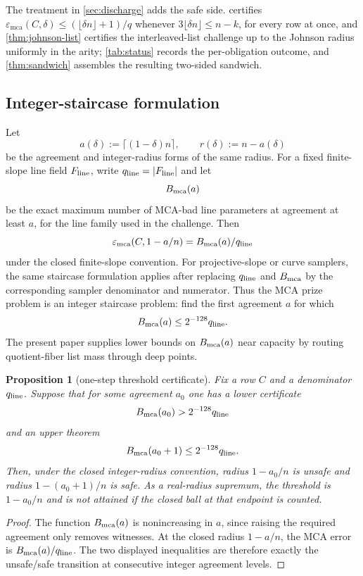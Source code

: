 \documentclass[11pt]{article}
\newtheorem{proposition}[proposition]{Proposition}
\theoremstyle{definition}
\theoremstyle{remark}
\newcommand{\emca}{\varepsilon_{\mathrm{mca}}}
\begin{document}
The treatment in \cref{sec:discharge} adds the safe side.  certifies $\emca(C,\delta)\le(\lfloor\delta n\rfloor+1)/q$ whenever $3\lfloor\delta n\rfloor\le n-k$, for every row at once, and \cref{thm:johnson-list} certifies the interleaved-list challenge up to the Johnson radius uniformly in the arity; \cref{tab:status} records the per-obligation outcome, and \cref{thm:sandwich} assembles the resulting two-sided sandwich.

\subsection{Integer-staircase formulation}

Let
\[
        a(\delta):=\lceil(1-\delta)n\rceil,
        \qquad r(\delta):=n-a(\delta)
\]
be the agreement and integer-radius forms of the same radius.  For a fixed finite-slope line
field $F_{\rm line}$, write $q_{\rm line}=|F_{\rm line}|$ and let
\[
        B_{\rm mca}(a)
\]
be the exact maximum number of MCA-bad line parameters at agreement at least
$a$, for the line family used in the challenge.  Then
\[
        \emca(C,1-a/n)=B_{\rm mca}(a)/q_{\rm line}
\]
under the closed finite-slope convention.  For projective-slope or curve samplers, the same staircase formulation applies after replacing $q_{\rm line}$ and $B_{\rm mca}$ by the corresponding sampler denominator and numerator.  Thus the MCA prize problem is an
integer staircase problem: find the first agreement $a$ for which
\[
        B_{\rm mca}(a)\le 2^{-128}q_{\rm line}.
\]
The present paper supplies lower bounds on $B_{\rm mca}(a)$ near capacity by
routing quotient-fiber list mass through deep points.

\begin{proposition}[one-step threshold certificate]\label{prop:onestep}
Fix a row $C$ and a denominator $q_{\rm line}$.  Suppose that for some agreement
$a_0$ one has a lower certificate
\[
        B_{\rm mca}(a_0)>2^{-128}q_{\rm line}
\]
and an upper theorem
\[
        B_{\rm mca}(a_0+1)\le2^{-128}q_{\rm line}.
\]
Then, under the closed integer-radius convention, radius $1-a_0/n$ is unsafe and
radius $1-(a_0+1)/n$ is safe.  As a real-radius supremum, the threshold is
$1-a_0/n$ and is not attained if the closed ball at that endpoint is counted.
\end{proposition}

\begin{proof}
The function $B_{\rm mca}(a)$ is nonincreasing in $a$, since raising the
required agreement only removes witnesses.  At the closed radius $1-a/n$, the
MCA error is $B_{\rm mca}(a)/q_{\rm line}$.  The two displayed inequalities are
therefore exactly the unsafe/safe transition at consecutive integer agreement
levels.
\end{proof}
\end{document}
